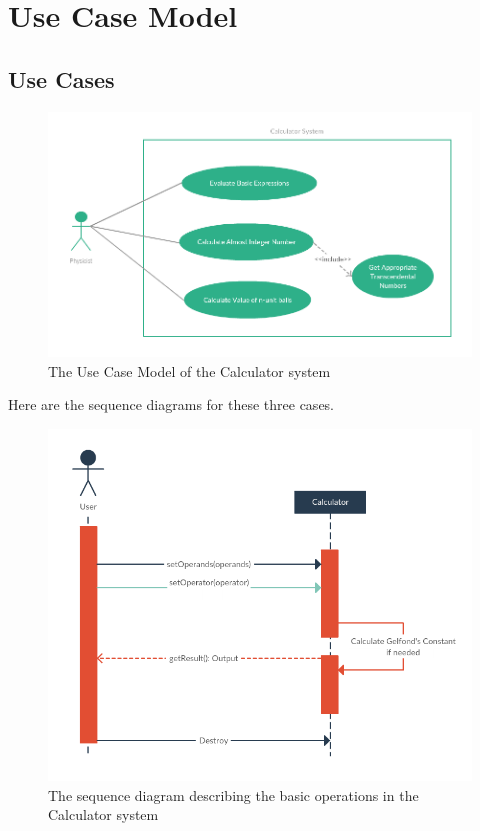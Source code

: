 \documentclass{article}
\begin{document}
\clearpage

\section{Use Case Model}
\subsection{Use Cases}
\begin{center}
    \begin{figure}[h!]
      \includegraphics[scale=0.45]{images/n4-use-case.png}
      \caption{The Use Case Model of the Calculator system}
    \end{figure}
\end{center}
\begin{flushleft}
Here are the sequence diagrams for these three cases.
\end{flushleft}

\begin{center}
    \begin{figure}[h!]
      \includegraphics[scale=0.38]{images/n4-sequence-0.png}   
      \caption{The sequence diagram describing the basic operations in the Calculator system}
    \end{figure}
\end{center}
\end{document}
